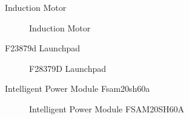 \begin{frame}{Induction Motor}
	\begin{figure}
		\centering


		\caption{Induction Motor}

	\end{figure}
\end{frame}

\begin{frame}{F23879d Launchpad}
	\begin{figure}
		\centering


		\caption{F28379D Launchpad}
	\end{figure}
\end{frame}

\begin{frame}{Intelligent Power Module Fsam20sh60a}
	\begin{figure}
		\centering


		\caption{Intelligent Power Module FSAM20SH60A}
	\end{figure}
\end{frame}

